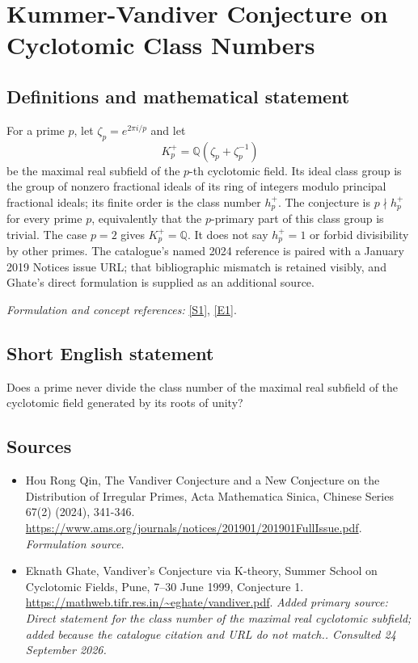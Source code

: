 \documentclass[11pt]{article}
\begin{document}
\section*{\texorpdfstring{Kummer-Vandiver Conjecture on Cyclotomic Class Numbers}{Kummer-Vandiver Conjecture on Cyclotomic Class Numbers}}\label{353}
\subsection{Definitions and mathematical statement}
For a prime $p$, let $\zeta_p=e^{2\pi i/p}$ and let
\[
 K_p^+={\mathbb{Q}}(\zeta_p+\zeta_p^{-1})
\]
be the maximal real subfield of the $p$-th cyclotomic field. Its ideal class group is the group of nonzero fractional ideals of its ring of integers modulo principal fractional ideals; its finite order is the class number $h_p^+$. The conjecture is $p\nmid h_p^+$ for every prime $p$, equivalently that the $p$-primary part of this class group is trivial. The case $p=2$ gives $K_p^+={\mathbb{Q}}$. It does not say $h_p^+=1$ or forbid divisibility by other primes. The catalogue's named 2024 reference is paired with a January 2019 Notices issue URL; that bibliographic mismatch is retained visibly, and Ghate's direct formulation is supplied as an additional source.
\par\smallskip\textit{Formulation and concept references:} \href{https://www.ams.org/journals/notices/201901/201901FullIssue.pdf}{[S1]}, \href{https://mathweb.tifr.res.in/~eghate/vandiver.pdf}{[E1]}.

\subsection{Short English statement}
Does a prime never divide the class number of the maximal real subfield of the cyclotomic field generated by its roots of unity?
\subsection{Sources}
\begin{itemize}
\item[S1]Hou Rong Qin, The Vandiver Conjecture and a New Conjecture on the Distribution of Irregular Primes, Acta Mathematica Sinica, Chinese Series 67(2) (2024), 341-346.
\url{https://www.ams.org/journals/notices/201901/201901FullIssue.pdf}.
\textit{Formulation source.}
\item[E1]Eknath Ghate, Vandiver’s Conjecture via K-theory, Summer School on Cyclotomic Fields, Pune, 7–30 June 1999, Conjecture 1.
\url{https://mathweb.tifr.res.in/~eghate/vandiver.pdf}.
\textit{Added primary source: Direct statement for the class number of the maximal real cyclotomic subfield; added because the catalogue citation and URL do not match.. Consulted 24 September 2026.}
\end{itemize}
\end{document}
